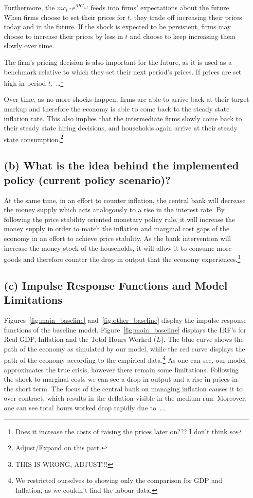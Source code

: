 \documentclass[12pt]{article}
\begin{document}
Furthermore, the $mc_t \cdot e^{MC_{s, t}}$ feeds into firms' expectations about the future. When firms choose to set their prices for $t$, they trade off increasing their prices today and in the future. If the shock is expected to be persistent, firms may choose to increase their prices by less in $t$ and choose to keep increasing them slowly over time. 

The firm's pricing decision is also important for the future, as it is used as a benchmark relative to which they set their next period's prices. If prices are set high in period $t$,\ \dots\footnote{Does it increase the costs of raising the prices later on??? I don't think so}

Over time, as no more shocks happen, firms are able to arrive back at their target markup and therefore the economy is able to come back to the steady state inflation rate. This also implies that the intermediate firms slowly come back to their steady state hiring decisions, and households again arrive at their steady state consumption.\footnote{Adjust/Expand on this part.}

\subsection*{(b) What is the idea behind the implemented policy (current policy scenario)?}

At the same time, in an effort to counter inflation, the central bank will decrease the money supply which acts analogously to a rise in the interest rate. By following the price stability oriented monetary policy rule, it will increase the money supply in order to match the inflation and marginal cost gaps of the economy in an effort to achieve price stability. As the bank intervention will increase the money stock of the households, it will allow it to consume more goods and therefore counter the drop in output that the economy experiences.\footnote{THIS IS WRONG, ADJUST!!!}

\subsection*{(c) Impulse Response Functions and Model Limitations}

Figures~\ref{fig:main_baseline} and~\ref{fig:other_baseline} display the impulse response functions of the baseline model. Figure~\ref{fig:main_baseline} displays the IRF's for Real GDP, Inflation and the Total Hours Worked ($L$). The blue curve shows the path of the economy as simulated by our model, while the red curve displays the path of the economy according to the empirical data.\footnote{We restricted ourselves to showing only the comparison for GDP and Inflation, as we couldn't find the labour data.} As one can see, our model approximates the true crisis, however there remain some limitations. Following the shock to marginal costs we can see a drop in output and a rise in prices in the short term. The focus of the central bank on managing inflation causes it to over-contract, which results in the deflation visible in the medium-run. Moreover, one can see total hours worked drop rapidly due to\ \dots. 
\end{document}
